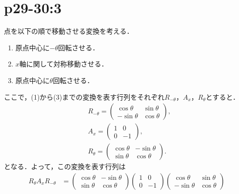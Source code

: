 \documentclass[a4paper,10pt,fleqn]{ltjsarticle}
\begin{document}
\section*{p29-30:3}

\begin{tleftbar}
    点を以下の順で移動させる変換を考える．
    \begin{enumerate}
        \item 原点中心に$-\theta$回転させる．
        \item $x$軸に関して対称移動させる．
        \item 原点中心に$\theta$回転させる．
    \end{enumerate}
    ここで，(1)から(3)までの変換を表す行列をそれぞれ$R_{-\theta}$，$A_{x}$，$R_{\theta}$とすると．
    \begin{align*}
         & R_{-\theta} = \begin{pmatrix} \cos \theta & \sin \theta \\ -\sin \theta & \cos \theta \end{pmatrix} , \\
         & A_{x} = \begin{pmatrix} 1 & 0 \\ 0 & -1 \end{pmatrix} ,                                               \\
         & R_{\theta} = \begin{pmatrix} \cos \theta & -\sin \theta \\ \sin \theta & \cos \theta \end{pmatrix} .
    \end{align*}
    となる．よって，この変換を表す行列は
    \begin{align*}
        R_{\theta} A_x R_{-\theta} & =\begin{pmatrix} \cos \theta & -\sin \theta \\ \sin \theta & \cos \theta \end{pmatrix}
        \begin{pmatrix} 1 & 0 \\ 0 & -1 \end{pmatrix}
        \begin{pmatrix} \cos \theta & \sin \theta \\ -\sin \theta & \cos \theta \end{pmatrix}                                                                                                \\

\end{align*}
\end{tleftbar}
\end{document}
